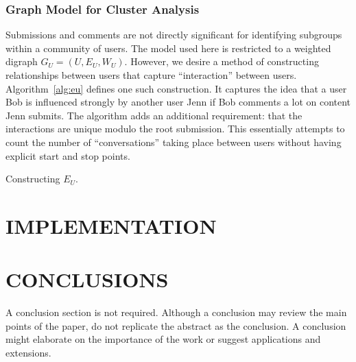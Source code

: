 \documentclass[letterpaper, 10 pt, conference]{ieeeconf}
\theoremstyle{plain}
\begin{document}
\subsubsection{Graph Model for Cluster Analysis}
Submissions and comments are not directly significant for identifying subgroups within a community of users. The model used here is restricted to a weighted digraph \(G_U = (U, E_U, W_U).\) However, we desire a method of constructing relationships between users that capture ``interaction'' between users. Algorithm~\ref{alg:eu} defines one such construction. It captures the idea that a user Bob is influenced strongly by another user Jenn if Bob comments a lot on content Jenn submits. The algorithm adds an additional requirement: that the interactions are unique modulo the root submission. This essentially attempts to count the number of ``conversations'' taking place between users without having explicit start and stop points.
\begin{algorithm}
  \caption{Constructing \(E_U.\)}
  \label{alg:eu}
\end{algorithm}

\section{IMPLEMENTATION}

\section{CONCLUSIONS}

A conclusion section is not required. Although a conclusion may review the main points of the paper, do not replicate the abstract as the conclusion. A conclusion might elaborate on the importance of the work or suggest applications and extensions. 

\addtolength{\textheight}{-12cm}   %

\end{document}
